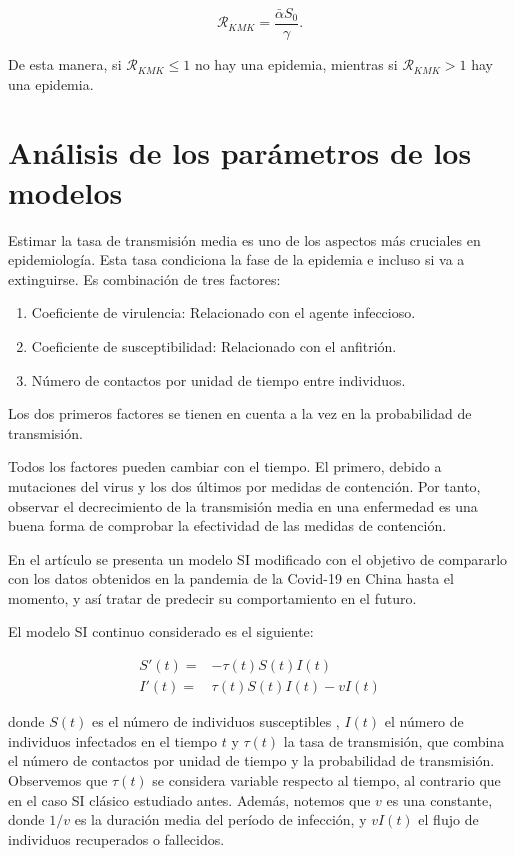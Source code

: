 $$\mathcal{R}_{KMK}=\frac{\bar{\alpha} S_0}{\gamma}.$$

De esta manera, si $\mathcal{R}_{KMK}\leq 1$ no hay una epidemia, mientras si $\mathcal{R}_{KMK}>1$ hay una epidemia. 





\section{Análisis de los parámetros de los modelos}

Estimar la tasa de transmisión media es uno de los aspectos más cruciales en epidemiología. Esta tasa condiciona la fase de la epidemia e incluso si va a extinguirse. Es combinación de tres factores:

\begin{enumerate}
\item Coeficiente de virulencia: Relacionado con el agente infeccioso.
\item Coeficiente de susceptibilidad: Relacionado con el anfitrión.
\item Número de contactos por unidad de tiempo entre individuos.
\end{enumerate}

Los dos primeros factores se tienen en cuenta a la vez en la probabilidad de transmisión.

Todos los factores pueden cambiar con el tiempo. El primero, debido a mutaciones del virus y los dos últimos por medidas de contención. Por tanto, observar el decrecimiento de la transmisión media en una enfermedad es una buena forma de comprobar la efectividad de las medidas de contención.

En el artículo \cite{demongeotSIEpidemicModel} se presenta un modelo SI modificado con el objetivo de compararlo con los datos obtenidos en la pandemia de la Covid-19 en China hasta el momento, y así tratar de predecir su comportamiento en el futuro.

El modelo SI continuo considerado es el siguiente:

\begin{equation}
\label{eqn: SI_cont}
\begin{aligned}
S'(t) = & -\tau (t)S(t)I(t) \\
I'(t) = & \tau (t)S(t)I(t) -vI(t)
\end{aligned}
\end{equation}

donde $S(t)$ es el número de individuos susceptibles , $I(t)$ el número de individuos infectados en el tiempo $t$ y $\tau (t)$ la tasa de transmisión, que combina el número de contactos por unidad de tiempo y la probabilidad de transmisión. Observemos que $\tau (t)$ se considera variable respecto al tiempo, al contrario que en el caso SI clásico estudiado antes. Además, notemos que $v$ es una constante, donde $1/v$ es la duración media del período de infección, y $vI(t)$ el flujo de individuos recuperados o fallecidos. %

